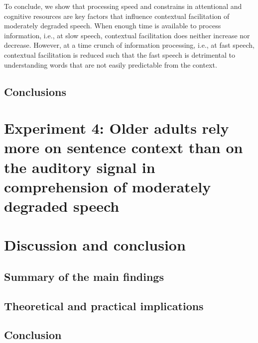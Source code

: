 \documentclass[a4paper, nobind]{templates/ociamthesis}
\begin{document}
To conclude, we show that processing speed and constrains in attentional and cognitive resources are key factors that influence contextual facilitation of moderately degraded speech.
When enough time is available to process information, i.e., at slow speech, contextual facilitation does neither increase nor decrease.
However, at a time crunch of information processing, i.e., at fast speech, contextual facilitation is reduced such that the fast speech is detrimental to understanding words that are not easily predictable from the context.

\hypertarget{conclusions-1}{%
\section{Conclusions}\label{conclusions-1}}

\hypertarget{experiment-4-older-adults-rely-more-on-sentence-context-than-on-the-auditory-signal-in-comprehension-of-moderately-degraded-speech}{%
\chapter{Experiment 4: Older adults rely more on sentence context than on the auditory signal in comprehension of moderately degraded speech}\label{experiment-4-older-adults-rely-more-on-sentence-context-than-on-the-auditory-signal-in-comprehension-of-moderately-degraded-speech}}

\minitoc

\hypertarget{discussion-and-conclusion}{%
\chapter{Discussion and conclusion}\label{discussion-and-conclusion}}

\hypertarget{summary-of-the-main-findings}{%
\section{Summary of the main findings}\label{summary-of-the-main-findings}}

\hypertarget{theoretical-and-practical-implications}{%
\section{Theoretical and practical implications}\label{theoretical-and-practical-implications}}

\hypertarget{conclusion-1}{%
\section{Conclusion}\label{conclusion-1}}
\end{document}
